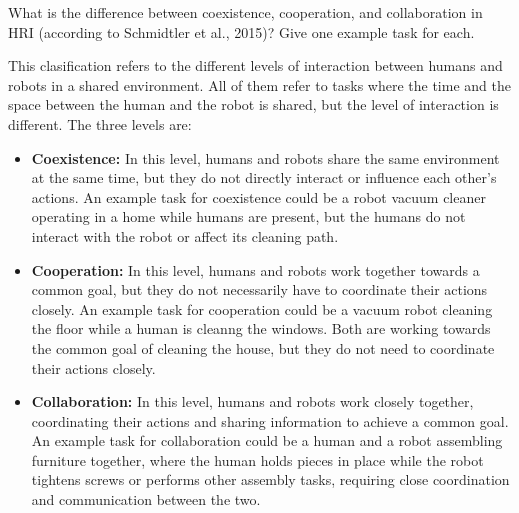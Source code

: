 \begin{ejercicio}
    What is the difference between coexistence, cooperation, and collaboration in HRI (according to Schmidtler et al., 2015)? Give one example task for each.

    This clasification refers to the different levels of interaction between humans and robots in a shared environment. All of them refer to tasks where the time and the space between the human and the robot is shared, but the level of interaction is different. The three levels are:
    \begin{itemize}
        \item \textbf{Coexistence:} In this level, humans and robots share the same environment at the same time, but they do not directly interact or influence each other's actions. An example task for coexistence could be a robot vacuum cleaner operating in a home while humans are present, but the humans do not interact with the robot or affect its cleaning path.
        \item \textbf{Cooperation:} In this level, humans and robots work together towards a common goal, but they do not necessarily have to coordinate their actions closely. An example task for cooperation could be a vacuum robot cleaning the floor while a human is cleanng the windows. Both are working towards the common goal of cleaning the house, but they do not need to coordinate their actions closely.
        \item \textbf{Collaboration:} In this level, humans and robots work closely together, coordinating their actions and sharing information to achieve a common goal. An example task for collaboration could be a human and a robot assembling furniture together, where the human holds pieces in place while the robot tightens screws or performs other assembly tasks, requiring close coordination and communication between the two.
    \end{itemize}
\end{ejercicio}

